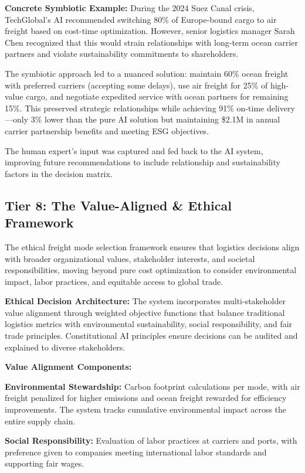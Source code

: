 \documentclass{article}
\begin{document}
\textbf{Concrete Symbiotic Example:}
During the 2024 Suez Canal crisis, TechGlobal's AI recommended switching 80\% of Europe-bound cargo to air freight based on cost-time optimization. However, senior logistics manager Sarah Chen recognized that this would strain relationships with long-term ocean carrier partners and violate sustainability commitments to shareholders. 

The symbiotic approach led to a nuanced solution: maintain 60\% ocean freight with preferred carriers (accepting some delays), use air freight for 25\% of high-value cargo, and negotiate expedited service with ocean partners for remaining 15\%. This preserved strategic relationships while achieving 91\% on-time delivery---only 3\% lower than the pure AI solution but maintaining \$2.1M in annual carrier partnership benefits and meeting ESG objectives.

The human expert's input was captured and fed back to the AI system, improving future recommendations to include relationship and sustainability factors in the decision matrix.

\subsection{Tier 8: The Value-Aligned \& Ethical Framework}

The ethical freight mode selection framework ensures that logistics decisions align with broader organizational values, stakeholder interests, and societal responsibilities, moving beyond pure cost optimization to consider environmental impact, labor practices, and equitable access to global trade.

\textbf{Ethical Decision Architecture:}
The system incorporates multi-stakeholder value alignment through weighted objective functions that balance traditional logistics metrics with environmental sustainability, social responsibility, and fair trade principles. Constitutional AI principles ensure decisions can be audited and explained to diverse stakeholders.

\textbf{Value Alignment Components:}

\textbf{Environmental Stewardship:} Carbon footprint calculations per mode, with air freight penalized for higher emissions and ocean freight rewarded for efficiency improvements. The system tracks cumulative environmental impact across the entire supply chain.

\textbf{Social Responsibility:} Evaluation of labor practices at carriers and ports, with preference given to companies meeting international labor standards and supporting fair wages.
\end{document}

